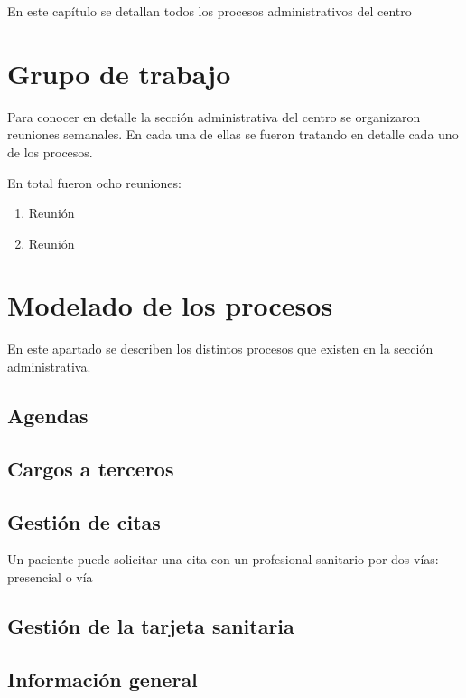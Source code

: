 En este capítulo se detallan todos los procesos administrativos del centro 

\section{Grupo de trabajo}

Para conocer en detalle la sección administrativa del centro se organizaron reuniones semanales. En cada una de ellas se fueron tratando en detalle cada uno de los procesos.

En total fueron ocho reuniones:

\begin{enumerate}
    \item Reunión
    \item Reunión
\end{enumerate}

\section{Modelado de los procesos}

En este apartado se describen los distintos procesos que existen en la sección administrativa. 

\subsection{Agendas}

\subsection{Cargos a terceros}



\subsection{Gestión de citas}

Un paciente puede solicitar una cita con un profesional sanitario por dos vías: presencial o vía

\subsection{Gestión de la tarjeta sanitaria}

\subsection{Información general}

